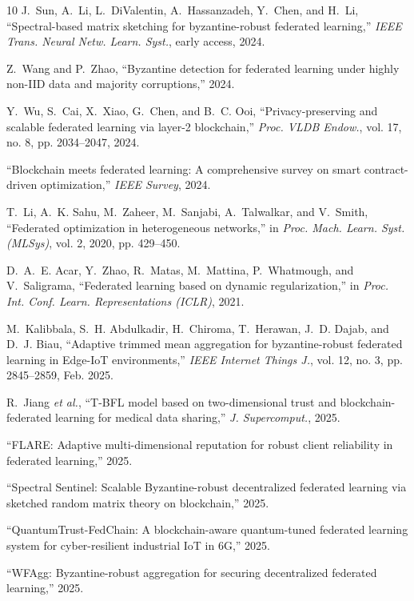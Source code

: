 \documentclass[12pt,a4paper,onecolumn]{article}
\begin{document}
\begin{thebibliography}{10}
J.~Sun, A.~Li, L.~DiValentin, A.~Hassanzadeh, Y.~Chen, and H.~Li,
``Spectral-based matrix sketching for byzantine-robust federated learning,''
\emph{IEEE Trans. Neural Netw. Learn. Syst.}, early access, 2024.

Z.~Wang and P.~Zhao,
``Byzantine detection for federated learning under highly non-IID data and majority corruptions,'' 2024.

Y.~Wu, S.~Cai, X.~Xiao, G.~Chen, and B.~C. Ooi,
``Privacy-preserving and scalable federated learning via layer-2 blockchain,''
\emph{Proc. VLDB Endow.}, vol. 17, no. 8, pp. 2034--2047, 2024.

``Blockchain meets federated learning: A comprehensive survey on smart contract-driven optimization,''
\emph{IEEE Survey}, 2024.

T.~Li, A.~K. Sahu, M.~Zaheer, M.~Sanjabi, A.~Talwalkar, and V.~Smith,
``Federated optimization in heterogeneous networks,''
in \emph{Proc. Mach. Learn. Syst. (MLSys)}, vol. 2, 2020, pp. 429--450.

D.~A.~E. Acar, Y.~Zhao, R.~Matas, M.~Mattina, P.~Whatmough, and V.~Saligrama,
``Federated learning based on dynamic regularization,''
in \emph{Proc. Int. Conf. Learn. Representations (ICLR)}, 2021.

M.~Kalibbala, S.~H. Abdulkadir, H.~Chiroma, T.~Herawan, J.~D. Dajab, and D.~J. Biau,
``Adaptive trimmed mean aggregation for byzantine-robust federated learning in Edge-IoT environments,''
\emph{IEEE Internet Things J.}, vol. 12, no. 3, pp. 2845--2859, Feb. 2025.

R.~Jiang \emph{et al.},
``T-BFL model based on two-dimensional trust and blockchain-federated learning for medical data sharing,''
\emph{J. Supercomput.}, 2025.

``FLARE: Adaptive multi-dimensional reputation for robust client reliability in federated learning,'' 2025.

``Spectral Sentinel: Scalable Byzantine-robust decentralized federated learning via sketched random matrix theory on blockchain,'' 2025.

``QuantumTrust-FedChain: A blockchain-aware quantum-tuned federated learning system for cyber-resilient industrial IoT in 6G,'' 2025.

``WFAgg: Byzantine-robust aggregation for securing decentralized federated learning,'' 2025.

\end{thebibliography}
\end{document}
